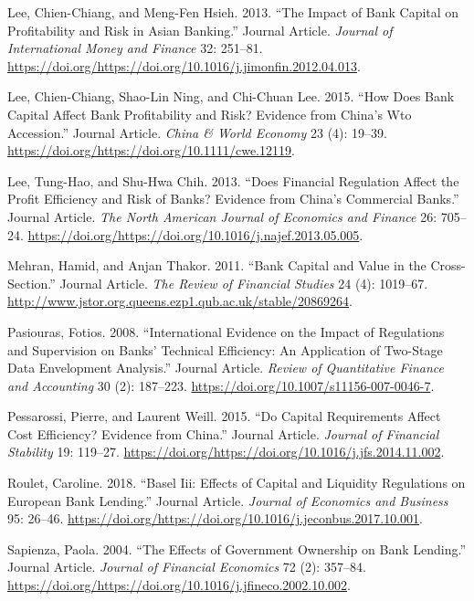 \documentclass{article}
\begin{document}
\leavevmode\hypertarget{ref-RN61}{}%
Lee, Chien-Chiang, and Meng-Fen Hsieh. 2013. ``The Impact of Bank
Capital on Profitability and Risk in Asian Banking.'' Journal Article.
\emph{Journal of International Money and Finance} 32: 251--81.
\url{https://doi.org/https://doi.org/10.1016/j.jimonfin.2012.04.013}.

\leavevmode\hypertarget{ref-RN62}{}%
Lee, Chien-Chiang, Shao-Lin Ning, and Chi-Chuan Lee. 2015. ``How Does
Bank Capital Affect Bank Profitability and Risk? Evidence from China's
Wto Accession.'' Journal Article. \emph{China \& World Economy} 23 (4):
19--39. \url{https://doi.org/https://doi.org/10.1111/cwe.12119}.

\leavevmode\hypertarget{ref-RN63}{}%
Lee, Tung-Hao, and Shu-Hwa Chih. 2013. ``Does Financial Regulation
Affect the Profit Efficiency and Risk of Banks? Evidence from China's
Commercial Banks.'' Journal Article. \emph{The North American Journal of
Economics and Finance} 26: 705--24.
\url{https://doi.org/https://doi.org/10.1016/j.najef.2013.05.005}.

\leavevmode\hypertarget{ref-RN64}{}%
Mehran, Hamid, and Anjan Thakor. 2011. ``Bank Capital and Value in the
Cross-Section.'' Journal Article. \emph{The Review of Financial Studies}
24 (4): 1019--67.
\url{http://www.jstor.org.queens.ezp1.qub.ac.uk/stable/20869264}.

\leavevmode\hypertarget{ref-RN65}{}%
Pasiouras, Fotios. 2008. ``International Evidence on the Impact of
Regulations and Supervision on Banks' Technical Efficiency: An
Application of Two-Stage Data Envelopment Analysis.'' Journal Article.
\emph{Review of Quantitative Finance and Accounting} 30 (2): 187--223.
\url{https://doi.org/10.1007/s11156-007-0046-7}.

\leavevmode\hypertarget{ref-RN66}{}%
Pessarossi, Pierre, and Laurent Weill. 2015. ``Do Capital Requirements
Affect Cost Efficiency? Evidence from China.'' Journal Article.
\emph{Journal of Financial Stability} 19: 119--27.
\url{https://doi.org/https://doi.org/10.1016/j.jfs.2014.11.002}.

\leavevmode\hypertarget{ref-RN68}{}%
Roulet, Caroline. 2018. ``Basel Iii: Effects of Capital and Liquidity
Regulations on European Bank Lending.'' Journal Article. \emph{Journal
of Economics and Business} 95: 26--46.
\url{https://doi.org/https://doi.org/10.1016/j.jeconbus.2017.10.001}.

\leavevmode\hypertarget{ref-RN69}{}%
Sapienza, Paola. 2004. ``The Effects of Government Ownership on Bank
Lending.'' Journal Article. \emph{Journal of Financial Economics} 72
(2): 357--84.
\url{https://doi.org/https://doi.org/10.1016/j.jfineco.2002.10.002}.
\end{document}
